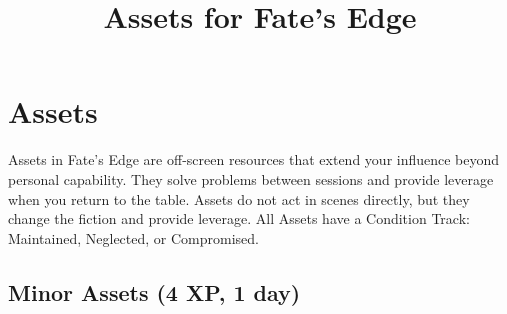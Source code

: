 \documentclass[12pt]{article}
\title{Assets for Fate's Edge}
\author{}
\date{}
\begin{document}
\maketitle

\section*{Assets}

Assets in Fate's Edge are off-screen resources that extend your influence beyond personal capability. They solve problems between sessions and provide leverage when you return to the table. Assets do not act in scenes directly, but they change the fiction and provide leverage. All Assets have a Condition Track: Maintained, Neglected, or Compromised.

\subsection*{Minor Assets (4 XP, 1 day)}
\end{document}
